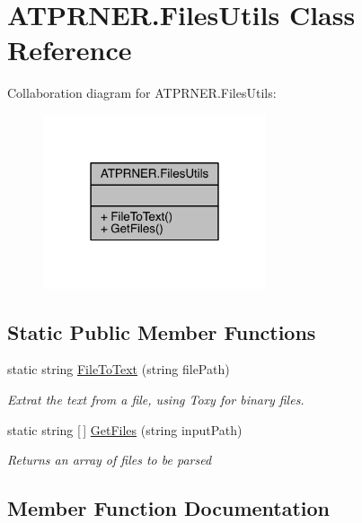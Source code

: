 \hypertarget{class_a_t_p_r_n_e_r_1_1_files_utils}{}\section{A\+T\+P\+R\+N\+E\+R.\+Files\+Utils Class Reference}
\label{class_a_t_p_r_n_e_r_1_1_files_utils}


Collaboration diagram for A\+T\+P\+R\+N\+E\+R.\+Files\+Utils\+:
\nopagebreak
\begin{figure}[H]
\begin{center}
\leavevmode
\includegraphics[width=186pt]{d5/dc5/class_a_t_p_r_n_e_r_1_1_files_utils__coll__graph}
\end{center}
\end{figure}
\subsection*{Static Public Member Functions}
\begin{DoxyCompactItemize}
\item 
static string \hyperlink{class_a_t_p_r_n_e_r_1_1_files_utils_adaf763c34895368bcfe1254086d87f99}{File\+To\+Text} (string file\+Path)
\begin{DoxyCompactList}\small\item\em Extrat the text from a file, using Toxy for binary files. \end{DoxyCompactList}\item 
static string \mbox{[}$\,$\mbox{]} \hyperlink{class_a_t_p_r_n_e_r_1_1_files_utils_aa9ee9ca4b22ddc16322bff7ea1d979bb}{Get\+Files} (string input\+Path)
\begin{DoxyCompactList}\small\item\em Returns an array of files to be parsed \end{DoxyCompactList}\end{DoxyCompactItemize}


\subsection{Member Function Documentation}
\hypertarget{class_a_t_p_r_n_e_r_1_1_files_utils_adaf763c34895368bcfe1254086d87f99}{}\label{class_a_t_p_r_n_e_r_1_1_files_utils_adaf763c34895368bcfe1254086d87f99} 
